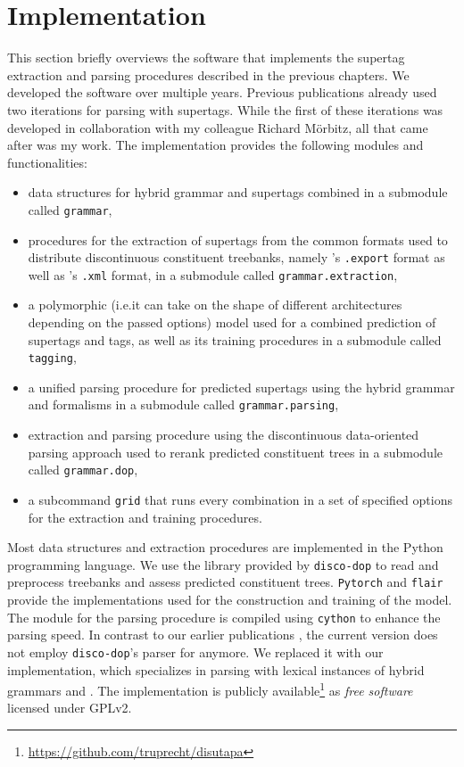 \documentclass[../../document.tex]{subfiles}
\begin{document}
    \section{Implementation}\label{sec:implementation}
    This section briefly overviews the software that implements the supertag extraction and parsing procedures described in the previous chapters.
    We developed the software over multiple years. Previous publications already used two iterations for parsing with  supertags. \citep{RupMoe21,Rup22}
    While the first of these iterations was developed in collaboration with my colleague Richard Mörbitz, all that came after was my work.
    The implementation provides the following modules and functionalities:
    \begin{itemize}
        \item data structures for hybrid grammar and  supertags combined in a submodule called \texttt{grammar},
        \item procedures for the extraction of supertags from the common formats used to distribute discontinuous constituent treebanks, namely \negra{}'s \texttt{.export} format as well as \tiger{}'s \texttt{.xml} format, in a submodule called \texttt{grammar.extraction},
        \item a polymorphic (i.e.\@ it can take on the shape of different architectures depending on the passed options)  model used for a combined prediction of supertags and  tags, as well as its training procedures in a submodule called \texttt{tagging}, 
        \item a unified parsing procedure for predicted supertags using the hybrid grammar and  formalisms in a submodule called \texttt{grammar.parsing},
        \item extraction and parsing procedure using the discontinuous data-oriented parsing approach used to rerank predicted constituent trees in a submodule called \texttt{grammar.dop},
        \item a subcommand \texttt{grid} that runs every combination in a set of specified options for the extraction and training procedures.
    \end{itemize}
    
    Most data structures and extraction procedures are implemented in the Python programming language.
    We use the library provided by \texttt{disco-dop} \citep{Cra12} to read and preprocess treebanks and assess predicted constituent trees.
    \texttt{Pytorch} \citep{paszke2019pytorch} and \texttt{flair} \citep{Akb19} provide the implementations used for the construction and training of the  model.
    The module for the parsing procedure is compiled using \texttt{cython} \citep{behnel2011cython} to enhance the parsing speed.
    In contrast to our earlier publications \citet{RupMoe21,Rup22}, the current version does not employ \texttt{disco-dop}'s parser for  anymore.
    We replaced it with our implementation, which specializes in parsing with lexical instances of hybrid grammars and .
    The implementation is publicly available\footnote{\url{https://github.com/truprecht/disutapa}} as \emph{free software} licensed under GPLv2.
\end{document}
